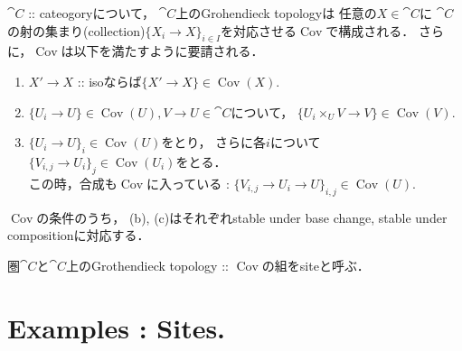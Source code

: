 \documentclass[a4paper]{jsarticle}
\newcommand{\Cov}{\operatorname{Cov}}
\begin{document}
\begin{Def}
    $\cat{C}$ :: cateogoryについて，
    $\cat{C}$上のGrohendieck topologyは
    任意の$X \in \cat{C}$に
    $\cat{C}$の射の集まり(collection)$\{X_i \to X\}_{i \in I}$を対応させる$\Cov$で構成される．
    さらに，$\Cov$は以下を満たすように要請される．
    \begin{enumerate}[label=(\alph*)]
        \item
            $X' \to X$ :: isoならば$\{X' \to X\} \in \Cov(X)$.
        \item
            $\{U_i \to U\} \in \Cov(U), V \to U \in \cat{C}$について，
            $\{U_i \times_U V \to V\} \in \Cov(V)$.
        \item
            $\{U_i \to U\}_i \in \Cov(U)$をとり，
            さらに各$i$について$\{V_{i,j} \to U_i\}_j \in \Cov(U_i)$をとる． \mbox{}\\
            この時，合成も$\Cov$に入っている : $\{V_{i,j} \to U_i \to U\}_{i,j} \in \Cov(U)$.
    \end{enumerate}
\end{Def}

\begin{Remark}\label{rem:grotop_stablecond}
    $\Cov$の条件のうち，
    (b), (c)はそれぞれstable under base change, stable under compositionに対応する．
\end{Remark}

\begin{Def}[Site]
    圏$\cat{C}$と$\cat{C}$上のGrothendieck topology :: $\Cov$の組をsiteと呼ぶ．
\end{Def}

\section{Examples : Sites.}
\begin{Example}
    
\end{Example}
\end{document}
